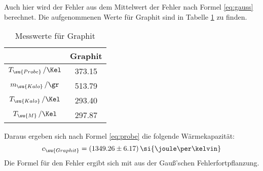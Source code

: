 Auch hier wird der Fehler aus dem Mittelwert der Fehler nach Formel \eqref{eq:gauss}
berechnet.
Die aufgenommenen Werte für Graphit sind in Tabelle \ref{tab:alug}
zu finden.
\begin{table}
  \centering
  \begin{tabular}{c c}
    \toprule
    \hrulefill & Graphit \\
    \midrule
    $T_\su{Probe}\,/\Kel$& 373.15 \\
    $m_\su{Kalo}\,/\gr$  & 513.79 \\
    $T_\su{Kalo}\,/\Kel$ & 293.40 \\
    $T_\su{M}\,/\Kel$    & 297.87 \\
    \bottomrule
  \end{tabular}
  \caption{Messwerte für Graphit}
  \label{tab:alug}
\end{table}
Daraus ergeben sich nach Formel \eqref{eq:probe} die folgende Wärmekapazität:
\begin{equation}
  c_\su{Graphit}= (1349.26\pm6.17)\,\si{\joule\per\kelvin}
\end{equation}
Die Formel für den Fehler ergibt sich mit
aus der Gauß'schen Fehlerfortpflanzung.
